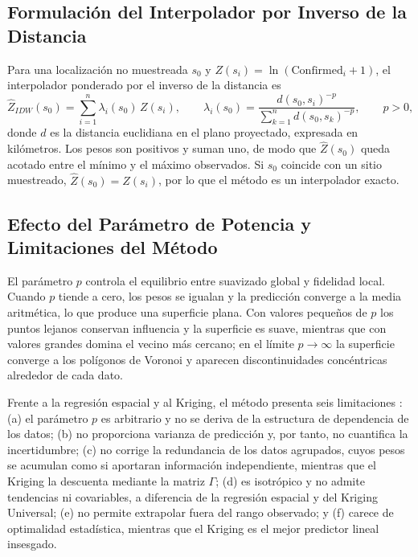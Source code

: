\documentclass[12pt,a4paper]{article}
\begin{document}
\subsection{Formulación del Interpolador por Inverso de la Distancia}

Para una localización no muestreada $s_0$ y $Z(s_i)=\ln(\text{Confirmed}_i+1)$, el interpolador ponderado por el inverso de la distancia \citep{shepard1968} es
\[
\hat Z_{IDW}(s_0)=\sum_{i=1}^{n}\lambda_i(s_0)\,Z(s_i),\qquad
\lambda_i(s_0)=\frac{d(s_0,s_i)^{-p}}{\sum_{k=1}^{n}d(s_0,s_k)^{-p}},\qquad p>0,
\]
donde $d$ es la distancia euclidiana en el plano proyectado, expresada en kilómetros. Los pesos son positivos y suman uno, de modo que $\hat Z(s_0)$ queda acotado entre el mínimo y el máximo observados. Si $s_0$ coincide con un sitio muestreado, $\hat Z(s_0)=Z(s_i)$, por lo que el método es un interpolador exacto.

\subsection{Efecto del Parámetro de Potencia y Limitaciones del Método}

El parámetro $p$ controla el equilibrio entre suavizado global y fidelidad local. Cuando $p$ tiende a cero, los pesos se igualan y la predicción converge a la media aritmética, lo que produce una superficie plana. Con valores pequeños de $p$ los puntos lejanos conservan influencia y la superficie es suave, mientras que con valores grandes domina el vecino más cercano; en el límite $p\to\infty$ la superficie converge a los polígonos de Voronoi y aparecen discontinuidades concéntricas alrededor de cada dato.

Frente a la regresión espacial y al Kriging, el método presenta seis limitaciones \citep{isaaks1989,webster2007}: (a) el parámetro $p$ es arbitrario y no se deriva de la estructura de dependencia de los datos; (b) no proporciona varianza de predicción y, por tanto, no cuantifica la incertidumbre; (c) no corrige la redundancia de los datos agrupados, cuyos pesos se acumulan como si aportaran información independiente, mientras que el Kriging la descuenta mediante la matriz $\Gamma$; (d) es isotrópico y no admite tendencias ni covariables, a diferencia de la regresión espacial y del Kriging Universal; (e) no permite extrapolar fuera del rango observado; y (f) carece de optimalidad estadística, mientras que el Kriging es el mejor predictor lineal insesgado.
\end{document}
